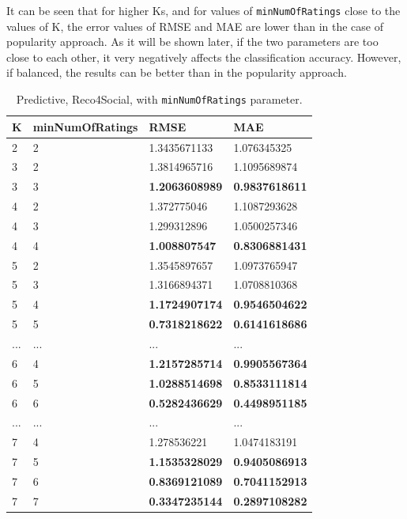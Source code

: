 \documentclass[12pt]{report}
\begin{document}
It can be seen that for higher Ks, and for values of \texttt{min\-Num\-Of\-Ratings} close to the values of K, the error values of RMSE and MAE are lower than in the case of popularity approach. As it will be shown later, if the two parameters are too close to each other, it very negatively affects the classification accuracy. However, if balanced, the results can be better than in the popularity approach. 

\begin{table}[htpb]
\centering
\caption{Predictive, Reco4Social, with \texttt{minNumOfRatings} parameter.}
\label{table.pred.reco2}
\vspace{3mm}
\begin{tabular}{|l|l|l|l|}
\hline
{\bf K} & {\bf minNumOfRatings} & {\bf RMSE}         & {\bf MAE}          \\ \hline
2       & 2                     & 1.3435671133       & 1.076345325        \\ \hline
3       & 2                     & 1.3814965716       & 1.1095689874       \\ \hline
3 & 3               & {\bf 1.2063608989} & {\bf 0.9837618611} \\ \hline
4       & 2                     & 1.372775046        & 1.1087293628       \\ \hline
4       & 3                     & 1.299312896        & 1.0500257346       \\ \hline
4 & 4               & {\bf 1.008807547}  & {\bf 0.8306881431} \\ \hline
5       & 2                     & 1.3545897657       & 1.0973765947       \\ \hline
5       & 3                     & 1.3166894371       & 1.0708810368       \\ \hline
5 & 4              & {\bf 1.1724907174} & {\bf 0.9546504622} \\ \hline
5 & 5               & {\bf 0.7318218622} & {\bf 0.6141618686} \\ \hline
...     & ...                   & ...                & ...                \\ \hline
6 & 4               & {\bf 1.2157285714} & {\bf 0.9905567364} \\ \hline
6 & 5              & {\bf 1.0288514698} & {\bf 0.8533111814} \\ \hline
6 & 6              & {\bf 0.5282436629} & {\bf 0.4498951185} \\ \hline
...     & ...                   & ...                & ...                \\ \hline
7       & 4                     & 1.278536221        & 1.0474183191       \\ \hline
7 & 5               & {\bf 1.1535328029} & {\bf 0.9405086913} \\ \hline
7 & 6               & {\bf 0.8369121089} & {\bf 0.7041152913} \\ \hline
7 & 7               & {\bf 0.3347235144} & {\bf 0.2897108282} \\ \hline
\end{tabular}
\end{table}
\end{document}
